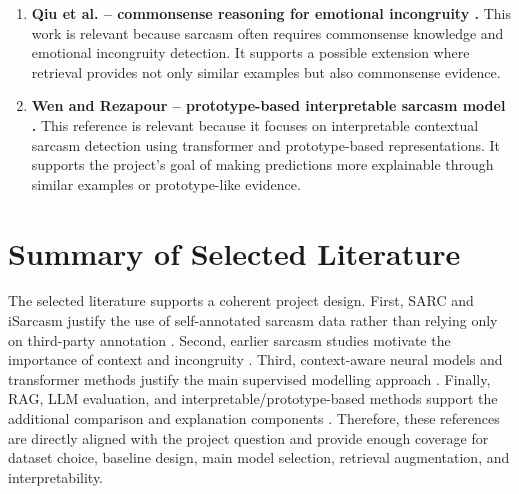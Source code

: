 \documentclass[%
 reprint,
 amsmath,amssymb,
 aps,
]{revtex4-2}
\begin{document}
\begin{enumerate}[leftmargin=*, itemsep=0.65em]
\item \textbf{Qiu et al. -- commonsense reasoning for emotional incongruity \cite{qiu2025emotional}.} This work is relevant because sarcasm often requires commonsense knowledge and emotional incongruity detection. It supports a possible extension where retrieval provides not only similar examples but also commonsense evidence.

\item \textbf{Wen and Rezapour -- prototype-based interpretable sarcasm model \cite{wen2026prototype}.} This reference is relevant because it focuses on interpretable contextual sarcasm detection using transformer and prototype-based representations. It supports the project's goal of making predictions more explainable through similar examples or prototype-like evidence.

\end{enumerate}

\section{Summary of Selected Literature}

The selected literature supports a coherent project design. First, SARC and iSarcasm justify the use of self-annotated sarcasm data rather than relying only on third-party annotation \cite{khodak2018large,oprea2020isarcasm}. Second, earlier sarcasm studies motivate the importance of context and incongruity \cite{wallace2014humans,riloff2013sarcasm,joshi2015harnessing}. Third, context-aware neural models and transformer methods justify the main supervised modelling approach \cite{hazarika2018cascade,dong2020transformer,baruah2020context,devlin2019bert,liu2019roberta,he2021deberta}. Finally, RAG, LLM evaluation, and interpretable/prototype-based methods support the additional comparison and explanation components \cite{lewis2020retrieval,wu2024rag,yu2023retrieval,zhang2024sarcasmbench,yao2025sarcasmcue,lee2025pragmatic,xiong2025sarc7,yang2025sarcasmr1,qiu2025emotional,wen2026prototype}. Therefore, these references are directly aligned with the project question and provide enough coverage for dataset choice, baseline design, main model selection, retrieval augmentation, and interpretability.



\end{document}
